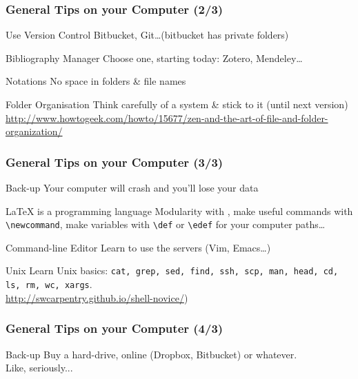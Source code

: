 \documentclass[]{beamer} %
\begin{document}
\begin{frame}[fragile]
\frametitle{General Tips on your Computer (2/3)}
\begin{block}{Use Version Control}
Bitbucket, Git\dots (bitbucket has private folders)
\end{block}
\begin{block}{Bibliography Manager}
Choose one, starting today: Zotero, Mendeley\dots
\end{block}
\begin{block}{Notations}
No space in folders \& file names
\end{block}
\begin{block}{Folder Organisation}
Think carefully of a system \&  stick to it (until next version)\\
\small{\url{http://www.howtogeek.com/howto/15677/zen-and-the-art-of-file-and-folder-organization/}}
\end{block}
\end{frame}


\begin{frame}[fragile]
\frametitle{General Tips on your Computer (3/3)}
\begin{block}{Back-up}
Your computer will crash and you'll lose your data
\end{block}
\begin{block}{LaTeX is a programming language}
Modularity with \verb++, make useful commands with \verb+\newcommand+, make variables with 
\verb+\def+ or \verb+\edef+ for your computer paths\dots
\end{block}
\begin{block}{Command-line Editor} 
Learn to use the servers (Vim, Emacs\dots)
\end{block}
\begin{block}{Unix}
Learn Unix basics: \verb+cat, grep, sed, find, ssh, scp, man, head, cd,+\\
\verb+ls, rm, wc, xargs+.\\
\small{\url{http://swcarpentry.github.io/shell-novice/})}
\end{block}
\end{frame}


\begin{frame}
\frametitle{General Tips on your Computer (4/3)}
\begin{block}{Back-up}
Buy a hard-drive, online (Dropbox,  Bitbucket) or whatever.\\
Like, seriously...
\end{block}
\end{frame}
\end{document}
